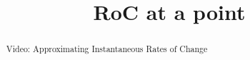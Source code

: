 \documentclass[handout]{ximera}
\title{RoC at a point}
\begin{document}
\begin{abstract} Video: Approximating Instantaneous Rates of Change %
\end{abstract}

\maketitle

\end{document}

